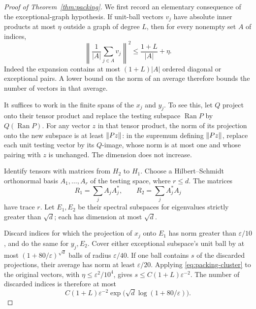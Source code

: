 \begin{proof}[Proof of Theorem~\ref{thm:packing}]
We first record an elementary consequence of the exceptional-graph
hypothesis.  If unit-ball vectors $v_j$ have absolute inner products
at most $\eta$ outside a graph of degree $L$, then for every nonempty
set $A$ of indices,
\begin{equation}\label{eq:packing-cluster}
 \left\|\frac1{|A|}\sum_{j\in A}v_j\right\|^2
       \le\frac{1+L}{|A|}+\eta.
\end{equation}
Indeed the expansion contains at most $(1+L)|A|$ ordered diagonal or
exceptional pairs.  A lower bound on the norm of an average therefore
bounds the number of vectors in that average.

It suffices to work in the finite spans of the $x_j$ and $y_j$.
To see this, let $Q$ project onto their tensor product and replace the
testing subspace $\operatorname{Ran}P$ by $Q(\operatorname{Ran}P)$.
For any vector $z$ in that tensor product, the norm of its projection
onto the new subspace is at least $\lVert Pz\rVert$: in the supremum defining
$\lVert Pz\rVert$, replace each unit testing vector by its $Q$-image, whose
norm is at most one and whose pairing with $z$ is unchanged.  The
dimension does not increase.

Identify tensors with matrices from $H_2$ to $H_1$.  Choose a
Hilbert--Schmidt orthonormal basis $A_1,\ldots,A_r$ of the testing
space, where $r\le d$.  The matrices
\[
 R_1=\sum_jA_jA_j^*,\qquad R_2=\sum_jA_j^*A_j
\]
have trace $r$.  Let $E_1,E_2$ be their spectral subspaces for
eigenvalues strictly greater than $\sqrt d$; each has dimension at most
$\sqrt d$.

Discard indices for which the projection of $x_j$ onto $E_1$ has norm
greater than $\varepsilon/10$, and do the same for $y_j,E_2$.
Cover either exceptional subspace's unit ball by at most
$(1+80/\varepsilon)^{\sqrt d}$ balls of radius $\varepsilon/40$.
If one ball contains $s$ of the discarded projections, their average
has norm at least $\varepsilon/20$.  Applying
\eqref{eq:packing-cluster} to the original vectors, with
$\eta\le\varepsilon^2/10^4$, gives
$s\le C(1+L)\varepsilon^{-2}$.  The number of discarded indices is
therefore at most
\begin{equation}\label{eq:packing-discarded}
 C(1+L)\varepsilon^{-2}
   \exp\!\bigl(\sqrt d\log(1+80/\varepsilon)\bigr).
\end{equation}


\end{proof}
